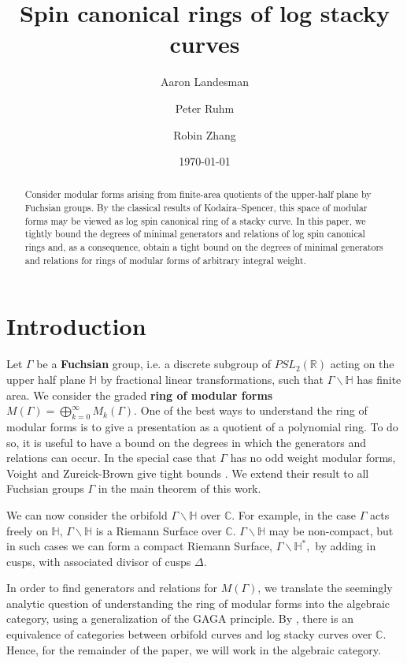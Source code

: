\documentclass{amsart}
\title{Spin canonical rings of log stacky curves}
\author{Aaron Landesman}
\author{Peter Ruhm}
\author{Robin Zhang}
\date{\today}
\theoremstyle{plain}
\theoremstyle{definition}
\theoremstyle{remark}
\numberwithin{equation}{section}
\newcommand\BH{{\mathbb H}}
\newcommand\BC{{\mathbb C}}
\newcommand\BR{{\mathbb R}}
\begin{document}
\begin{abstract}
 	Consider modular forms arising from finite-area
	quotients of the upper-half plane by Fuchsian groups.  
	By the classical results of Kodaira--Spencer, 
	this space of modular forms may be
	viewed as log spin canonical ring of a stacky curve.
	In this paper, we tightly bound the degrees of minimal
	generators and relations of log spin canonical rings and,
	as a consequence, 
	obtain a tight bound on the degrees of minimal generators and relations  		
	for rings of modular forms of arbitrary integral weight.
\end{abstract}

\maketitle


\section{Introduction}
Let $\Gamma$ be a {\bf Fuchsian} group, i.e. a discrete subgroup of
$PSL_2(\BR)$ acting on the upper half plane $\BH$ by fractional
linear transformations, such that $\Gamma \backslash \BH$ has finite area.
We consider the graded {\bf ring of modular forms}
$M(\Gamma) = \bigoplus_{k = 0}^\infty M_k(\Gamma)$. One of the best
ways to understand the ring of modular forms is to give a
presentation as a quotient of a polynomial ring.
To do so, it is useful to have a bound on the
degrees in which the generators and relations can occur. In the
special case that $\Gamma$ has no odd weight modular forms, Voight
and Zureick-Brown give tight bounds \cite[Chapters 7-9]{vzb:stacky}.
We extend their result to all Fuchsian groups $\Gamma$ in the main
theorem of this work.

We can now consider the orbifold $\Gamma \backslash \BH$ over $\BC$.
For example, in the case $\Gamma$ acts freely on $\BH$, $\Gamma
\backslash \BH$ is a Riemann Surface over $\BC$. 
$\Gamma \backslash \BH$ may be non-compact, but in such cases we can form a
compact Riemann Surface, $\Gamma \backslash \BH^*,$ by adding in
cusps, with associated divisor of cusps $\Delta$.

In order to find generators and relations for $M(\Gamma)$, we
translate the seemingly analytic question of understanding the ring
of modular forms into the algebraic category, using a
generalization of the GAGA principle. By \cite[Proposition 6.1.5]
{vzb:stacky}, there is an equivalence of categories between orbifold
curves and log stacky curves over $\BC$. Hence, for the remainder
of the paper, we will work in the algebraic category.
\end{document}
